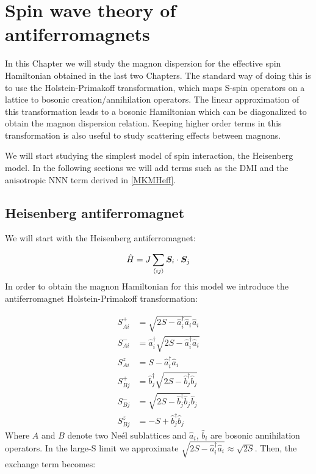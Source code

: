 \chapter{Spin wave theory of antiferromagnets}
\label{SpinWave}

In this Chapter we will study the magnon dispersion for the effective spin Hamiltonian obtained in the last two Chapters. The standard way of doing this is to use the Holstein-Primakoff transformation, which maps S-spin operators on a lattice to bosonic creation/annihilation operators. The linear approximation of this transformation leads to a bosonic Hamiltonian which can be diagonalized to obtain the magnon dispersion relation. Keeping higher order terms in this transformation is also useful to study scattering effects between magnons.

We will start studying the simplest model of spin interaction, the Heisenberg model. In the following sections we will add terms such as the DMI and the anisotropic NNN term derived in \ref{MKMHeff}.

\section{Heisenberg antiferromagnet}

We will start with the Heisenberg antiferromagnet:

\begin{equation}
\label{Heisenberg}
\hat{H} = J \sum_{\langle i j \rangle} \boldsymbol{S}_i\cdot \boldsymbol{S}_j
\end{equation}
In order to obtain the magnon Hamiltonian for this model we introduce the antiferromagnet Holstein-Primakoff transformation:

\begin{align}
S^+_{Ai} &= \sqrt{2S-\hat{a}^\dagger_i \hat{a}_i} \hat{a}_i \\
S^-_{Ai} &= \hat{a}^\dagger_i\sqrt{2S-\hat{a}^\dagger_i \hat{a}_i}  \\
S^z_{Ai} &= S - \hat{a}^\dagger_i \hat{a}_i \\
S^+_{Bj} &=\hat{b}^\dagger_j\sqrt{2S-\hat{b}^\dagger_j \hat{b}_j} \\
S^-_{Bj} &= \sqrt{2S-\hat{b}^\dagger_j \hat{b}_j} \hat{b}_j \\
S^z_{Bj} &= -S + \hat{b}^\dagger_j \hat{b}_j
\end{align}
Where $A$ and $B$ denote two Ne\'{e}l sublattices and $\hat{a}_i$, $\hat{b}_i$ are bosonic annihilation operators. In the large-S limit we approximate $ \sqrt{2S-\hat{a}^\dagger_i \hat{a}_i} \approx \sqrt{2S}$. Then, the exchange term becomes:

